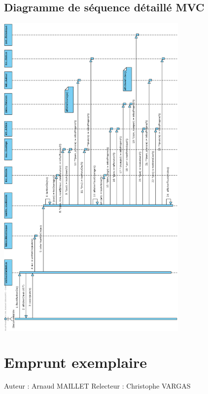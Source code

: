 \documentclass[a4paper,10pt]{report}
\begin{document}
\section*{Diagramme de séquence détaillé MVC}
\bigskip
\includegraphics[height=165mm]{RechParMotCleMVC.png}

\newpage


\chapter*{Emprunt exemplaire}

Auteur : Arnaud MAILLET
Relecteur : Christophe VARGAS
\end{document}
